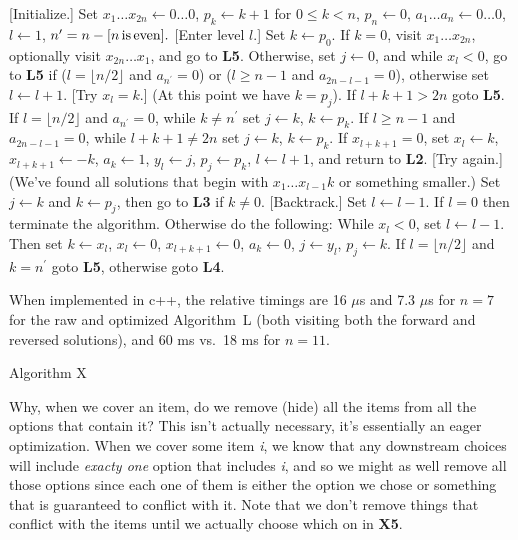  [Initialize.] Set $x_1 \ldots x_{2 n} \leftarrow 0 
\ldots 0$, $p_k \leftarrow k + 1$ for $0 \leq k < n$, $p_n \leftarrow 0$, 
$a_{1} \ldots a_{n} \leftarrow 0 \ldots 0$, $l \leftarrow 1$,
$n^{\prime} = n - [n \rm{\, is\, even}].$
\vskip 0.05in
 [Enter level $l$.] Set $k \gets p_0$.  If $k = 0$, visit
$x_1 \ldots x_{2n}$, optionally visit $x_{2n} \ldots x_1$, and 
go to {\bf L5}.  Otherwise, set $j \leftarrow 0$, and
while $x_l < 0$, go to {\bf L5} if ($l = \lfloor n / 2 \rfloor$ and 
$a_{n^{\prime}} = 0$) or ($l \ge n - 1$ and $a_{2n - l - 1} = 0$), otherwise
set $l \leftarrow l + 1$.
\vskip 0.05in
 [Try $x_l = k$.] (At this point we have $k = p_j$).  
If $l + k + 1 > 2n$ goto {\bf L5}.  If $l = \lfloor n / 2 \rfloor$ and 
$a_{n^{\prime}} = 0$, while $k \ne n^{\prime}$ set $j \leftarrow k$, 
$k \leftarrow p_k$.  If $l \ge n - 1$ and $a_{2n - l - 1} = 0$, while 
$l + k + 1 \ne 2 n $ set $j \leftarrow k$, $k \leftarrow p_k$.  If 
$x_{l + k + 1} = 0$, set $x_l \leftarrow k$, $x_{l + k + 1} \leftarrow - k$,
$a_k \leftarrow 1$, $y_l \leftarrow j$, $p_j \leftarrow p_k$, 
$l \leftarrow l + 1$, and return to {\bf L2}.
\vskip 0.05in
 [Try again.] (We've found all solutions that begin with 
$x_1 \ldots x_{l-1} k$ or something smaller.) Set $j \leftarrow k$ and 
$k \leftarrow p_j$, then go to {\bf L3} if $k \ne 0$.
\vskip 0.05in
 [Backtrack.] Set $l \leftarrow l - 1$.   If $l = 0$ then 
terminate the algorithm. Otherwise do the following: While $x_l < 0$, set 
$l \leftarrow l - 1$.  Then set $k \leftarrow x_l$, $x_l \leftarrow 0$, 
$x_{l + k + 1} \leftarrow 0$, $a_k \leftarrow 0$, $j \leftarrow y_l$, 
$p_j \leftarrow k$.  If $l = \lfloor n / 2 \rfloor$ and $k = n^{\prime}$
goto {\bf L5}, otherwise goto {\bf L4}.
\vskip 0.1in

\noindent When implemented in c++, the relative timings are 16 $\mu$s and 7.3 $\mu$s 
for $n = 7$ for the raw and optimized Algorithm~L (both visiting both the 
forward and reversed solutions), and 60 ms vs.\ 18 ms for $n = 11$.


 {Algorithm X}

\noindent Why, when we cover an item, do we remove (hide) all the items from 
all the options that contain it?  This isn't actually necessary, it's essentially 
an eager optimization.  When we cover some item {\it i}, we know that any 
downstream choices will include {\it exacty one} option that includes {\it i},
and so we might as well remove all those options since each one of them is
either the option we chose or something that is guaranteed to conflict with it.
Note that we don't remove things that conflict with the items until we actually
choose which on in {\bf X5}.

